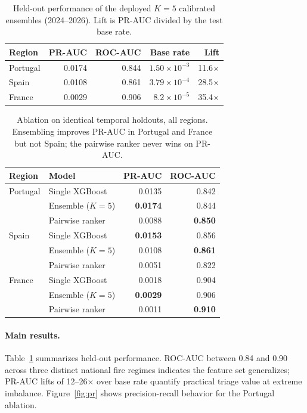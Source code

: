 \documentclass[11pt]{article}
\begin{document}
\begin{table}[t]
\centering
\small
\caption{Held-out performance of the deployed $K{=}5$ calibrated ensembles
(2024--2026). Lift is PR-AUC divided by the test base rate.}
\label{tab:main}
\begin{tabular}{lrrrr}
\toprule
Region & PR-AUC & ROC-AUC & Base rate & Lift \\
\midrule
Portugal & 0.0174 & 0.844 & $1.50\times10^{-3}$ & 11.6$\times$ \\
Spain & 0.0108 & 0.861 & $3.79\times10^{-4}$ & 28.5$\times$ \\
France & 0.0029 & 0.906 & $8.2\times10^{-5}$ & 35.4$\times$ \\
\bottomrule
\end{tabular}
\end{table}

\begin{table}[t]
\centering
\small
\caption{Ablation on identical temporal holdouts, all regions. Ensembling
improves PR-AUC in Portugal and France but not Spain; the pairwise ranker
never wins on PR-AUC.}
\label{tab:ablation}
\begin{tabular}{llrr}
\toprule
Region & Model & PR-AUC & ROC-AUC \\
\midrule
Portugal & Single XGBoost & 0.0135 & 0.842 \\
 & Ensemble ($K{=}5$) & \textbf{0.0174} & 0.844 \\
 & Pairwise ranker & 0.0088 & \textbf{0.850} \\
\midrule
Spain & Single XGBoost & \textbf{0.0153} & 0.856 \\
 & Ensemble ($K{=}5$) & 0.0108 & \textbf{0.861} \\
 & Pairwise ranker & 0.0051 & 0.822 \\
\midrule
France & Single XGBoost & 0.0018 & 0.904 \\
 & Ensemble ($K{=}5$) & \textbf{0.0029} & 0.906 \\
 & Pairwise ranker & 0.0011 & \textbf{0.910} \\
\bottomrule
\end{tabular}
\end{table}

\paragraph{Main results.} Table~\ref{tab:main} summarizes held-out
performance. ROC-AUC between 0.84 and 0.90 across three distinct national
fire regimes indicates the feature set generalizes; PR-AUC lifts of
12--26$\times$ over base rate quantify practical triage value at extreme
imbalance. Figure~\ref{fig:pr} shows precision-recall behavior for the
Portugal ablation.
\end{document}
